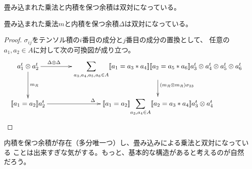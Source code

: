 		畳み込まれた乗法と内積を保つ余積は双対になっている。

		\begin{proposition}[内積を保つ余積の双対]\label{prop:内積を保つ余積の双対} %
			畳み込まれた乗法$m$と内積を保つ余積$\Delta$は双対になっている。
		\end{proposition} %
		\begin{proof} %
			$\sigma_{ij}$をテンソル積の$i$番目の成分と$j$番目の成分の置換として、
			任意の$a_1,a_2\in A$に対して次の可換図が成り立つ。
			\begin{equation}\xymatrix@C+1pc{
				a_1^t\otimes a_2^t \ar[d]^{m_R} \ar[r]^(0.2){\Delta\otimes \Delta} 
				& {\displaystyle\sum_{a_3,a_4,a_5,a_6\in A}}\jump{a_1=a_3*a_4}\jump{a_2=a_5*a_6}
					a_3^t\otimes a_4^t\otimes a_5^t\otimes a_6^t \ar[d]^{(m_R\otimes m_R)\sigma_{23}} \\
				\jump{a_1=a_2}a_2^t \ar[r]^{\Delta} 
				& \jump{a_1=a_2}{\displaystyle \sum_{a_3,a_4\in A}}\jump{a_2=a_3*a_4}a_3^t\otimes a_4^t \\
			}\end{equation}
		\end{proof} %

		\begin{todo}[写像空間の積と余積]\label{todo:写像空間の積と余積} %
			内積を保つ余積が存在（多分唯一つ）し、畳み込みによる乗法と双対になっている
			ことは出来すぎな気がする。もっと、基本的な構造があると考えるのが自然だろう。
		\end{todo} %

